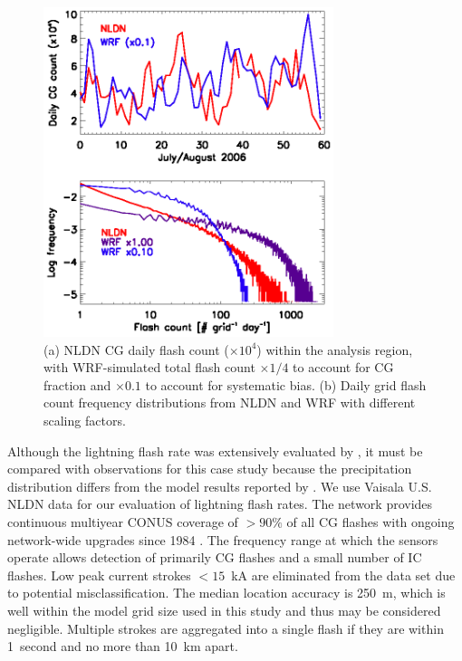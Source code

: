  \begin{figure}
 \noindent\includegraphics[width=20pc]{figures/ltng_dist.eps} %
 \caption{(a) NLDN CG daily flash count ($\times10^4$) within the analysis region, with
WRF-simulated total flash count $\times1/4$ to account for CG fraction and $\times0.1$
to account for systematic bias. (b) Daily grid flash count frequency distributions from
NLDN and WRF with different scaling factors.}
 \label{fig:lightning}
 \end{figure}

Although the lightning flash rate was extensively evaluated by \citet{Wong:2013vn}, it
must be compared with observations for this case study because the precipitation distribution
differs from the model results reported by \citet{Wong:2013vn}.
We use Vaisala U.S. NLDN data for our evaluation of lightning flash
rates. The network provides continuous multiyear CONUS coverage of $>90\%$ of all CG
flashes with ongoing network-wide upgrades since 1984 \citep{Orville:2002uq,Orville:2010uq}.
The frequency range at which the sensors operate allows detection of primarily CG flashes
and a small number of IC flashes. Low peak current strokes $<15$~kA are eliminated from
the data set due to potential misclassification. The median location accuracy is 250~m, which
is well within the model grid size used in this study and thus may be considered negligible.
Multiple strokes are aggregated into a single flash if they are within 1~second and no more
than 10~km apart.

